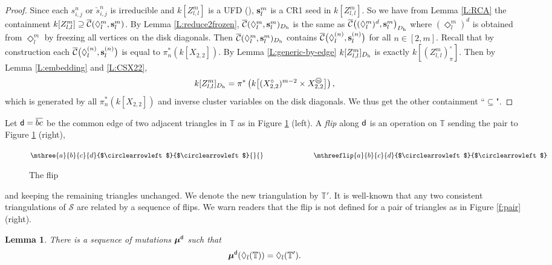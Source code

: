 \documentclass{amsart}
\newtheorem{lemma}[theorem]{Lemma}
\theoremstyle{definition}
\theoremstyle{remark}
\numberwithin{equation}{section}
\newcommand{\mc}[1]{\mathcal{#1}}
\newcommand{\mb}[1]{\mathbb{#1}}
\renewcommand{\b}[1]{\bold{#1}}
\newcommand{\bs}[1]{\boldsymbol{#1}}
\newcommand{\br}[1]{\overline{#1}}
\renewcommand{\d}{{\sf d}}
\newcommand{\uca}{\br{\mc{C}}}
\newcommand{\zllm}{{Z_{l,l}^m}}
\newcommand{\circm}{{\mathop{\text{\textcircled{\tiny \textit m}}}\nolimits}}
\newcommand{\ijn}{_{i,j}^{n}}
\begin{document}
\begin{proof} Since each $s\ijn$ or $\check{s}\ijn$ is irreducible and $k[\zllm]$ is a UFD (\cite[Theorem 3.17]{PV}), 
	$\b{s}_l^m$ is a CR1 seed in $k[\zllm]$. 
	So we have from Lemma \ref{L:RCA} the containment $k[\zllm] \supseteq \uca(\Diamond_l^m,\b{s}_l^m)$.
	By Lemma \ref{L:reduce2frozen}, $\uca(\Diamond_l^m,\b{s}_l^m)_{D_{\rm h}}$ is the same as $\uca\big((\Diamond_l^m)^{d},\b{s}_l^m\big)_{D_{\rm h}}$
	where $(\Diamond_l^m)^{d}$ is obtained from $\Diamond_l^m$ by freezing all vertices on the disk diagonals.
	Then $\uca(\Diamond_l^m,\b{s}_l^m)_{D_{\rm h}}$ contains  $\uca\big(\Diamond_l^{(n)},\b{s}_l^{(n)}\big)$ for all $n\in [2,m]$.
	Recall that by construction each $\uca\big(\Diamond_l^{(n)},\b{s}_l^{(n)}\big)$ is equal to $\pi_n^*(k[X_{2,2}])$.	
	By Lemma \ref{L:generic-by-edge} $k[\zllm]_{D_{\rm h}}$ is exactly $k[(\zllm)_\pi^\circ]$.
	Then by Lemma \ref{L:embedding} and \ref{L:CSX22}, 
	$$k[\zllm]_{D_{\rm h}}=\pi^*\left(k\big[(X_{2,2}^\circ)^{m-2}\times X_{2,2}^\circm\big]\right),$$ 
	which is generated by all $\pi_n^* \left(k[X_{2,2}]\right)$ and inverse cluster variables on the disk diagonals.
	We thus get the other containment ``$\subseteq$".
\end{proof}



Let $\d=\br{bc}$ be the common edge of two adjacent triangles in $\mb{T}$ as in Figure \ref{f:flip} (left).
A {\em flip} along $\d$ is an operation on $\mb{T}$ sending the pair to Figure \ref{f:flip} (right), 
\begin{figure}[!h] $\mthree{a}{b}{c}{d}{$\circlearrowleft$}{$\circlearrowleft$}{}{} \hspace{1in} \mthreeflip{a}{b}{c}{d}{$\circlearrowleft$}{$\circlearrowleft$}$ \caption{The flip} \label{f:flip} \end{figure}
and keeping the remaining triangles unchanged.
We denote the new triangulation by $\mb{T}'$.
It is well-known \cite{FST} that any two consistent triangulations of $\mc{S}$ are related by a sequence of flips.
We warn readers that the flip is not defined for a pair of triangles as in Figure \ref{f:pair} (right).
\begin{lemma}\cite[10.3]{FG} There is a sequence of mutations $\bs{\mu}^{\d}$ such that 
	$$\bs{\mu}^{\d}(\Diamond_l(\mb{T}))=\Diamond_l(\mb{T}').$$
\end{lemma}
\end{document}
